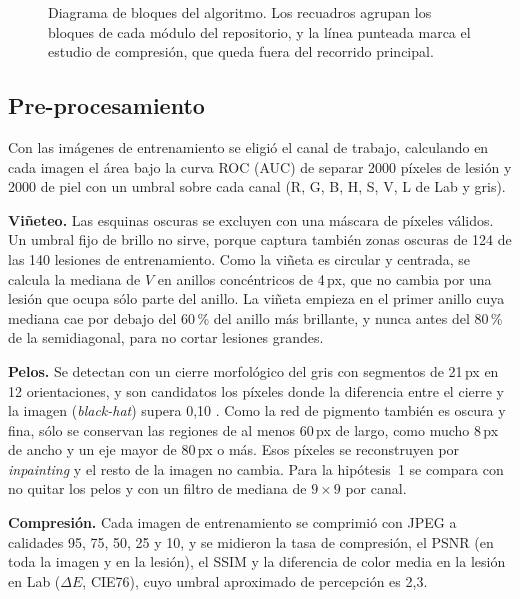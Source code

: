 \begin{figure}[!htb]
  \caption{Diagrama de bloques del algoritmo. Los recuadros agrupan los bloques de cada módulo del repositorio, y la línea punteada marca el estudio de compresión, que queda fuera del recorrido principal.}
  \label{fig:esquema}
\end{figure}

\subsection{Pre-procesamiento}
\label{sec:preprocesamiento}
Con las imágenes de entrenamiento se eligió el canal de trabajo, calculando en cada imagen el área bajo la curva ROC (AUC) de separar 2000 píxeles de lesión y 2000 de piel con un umbral sobre cada canal (R, G, B, H, S, V, L de Lab y gris).

\textbf{Viñeteo.} Las esquinas oscuras se excluyen con una máscara de píxeles válidos. Un umbral fijo de brillo no sirve, porque captura también zonas oscuras de 124 de las 140 lesiones de entrenamiento. Como la viñeta es circular y centrada, se calcula la mediana de $V$ en anillos concéntricos de 4\,px, que no cambia por una lesión que ocupa sólo parte del anillo. La viñeta empieza en el primer anillo cuya mediana cae por debajo del 60\,\% del anillo más brillante, y nunca antes del 80\,\% de la semidiagonal, para no cortar lesiones grandes.

\textbf{Pelos.} Se detectan con un cierre morfológico del gris con segmentos de 21\,px en 12 orientaciones, y son candidatos los píxeles donde la diferencia entre el cierre y la imagen (\emph{black-hat}) supera 0,10 \parencite{lee1997}. Como la red de pigmento también es oscura y fina, sólo se conservan las regiones de al menos 60\,px de largo, como mucho 8\,px de ancho y un eje mayor de 80\,px o más. Esos píxeles se reconstruyen por \emph{inpainting} \parencite{telea2004} y el resto de la imagen no cambia. Para la hipótesis~1 se compara con no quitar los pelos y con un filtro de mediana de $9\times9$ por canal.

\textbf{Compresión.} Cada imagen de entrenamiento se comprimió con JPEG a calidades 95, 75, 50, 25 y 10, y se midieron la tasa de compresión, el PSNR (en toda la imagen y en la lesión), el SSIM \parencite{wang2004} y la diferencia de color media en la lesión en Lab ($\Delta E$, CIE76), cuyo umbral aproximado de percepción es 2,3.

